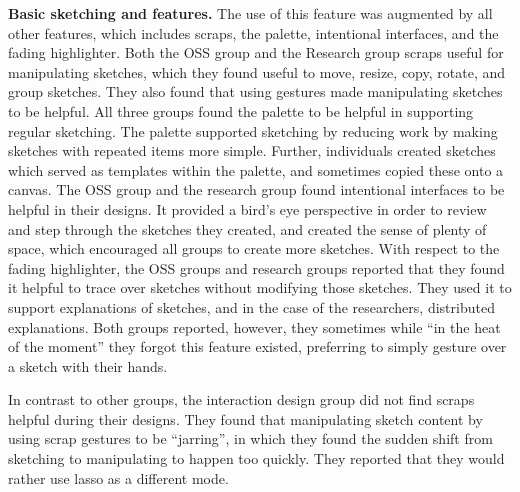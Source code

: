 
\textbf{Basic sketching and features.} The use of this feature was augmented by all other features, which includes scraps, the palette, intentional interfaces, and the fading highlighter. Both the OSS group and the Research group scraps useful for manipulating sketches, which they found useful to move, resize, copy, rotate, and group sketches. They also found that using gestures made manipulating sketches to be helpful. All three groups found the palette to be helpful in supporting regular sketching. The palette supported sketching by reducing work by making sketches with repeated items more simple. Further, individuals created sketches which served as templates within the palette, and sometimes copied these onto a canvas. The OSS group and the research group found intentional interfaces to be helpful in their designs. It provided a bird's eye perspective in order to review and step through the sketches they created, and created the sense of plenty of space, which encouraged all groups to create more sketches. With respect to the fading highlighter, the OSS groups and research groups reported that they found it helpful to trace over sketches without modifying those sketches. They used it to support explanations of sketches, and in the case of the researchers, distributed explanations. Both groups reported, however, they sometimes while ``in the heat of the moment'' they forgot this feature existed, preferring to simply gesture over a sketch with their hands.

In contrast to other groups, the interaction design group did not find scraps helpful during their designs. They found that manipulating sketch content by using scrap gestures to be ``jarring'', in which they found the sudden shift from sketching to manipulating to happen too quickly. They reported that they would rather use lasso as a different mode. 

